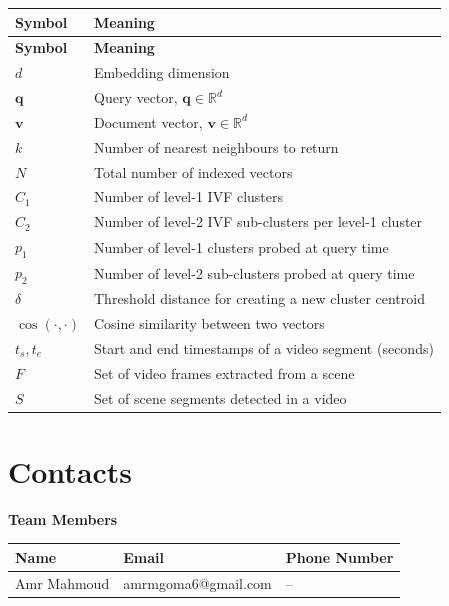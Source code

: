\documentclass[12pt, a4paper]{report}
\begin{document}
\begin{longtable}{>{\bfseries}p{3cm} p{10cm}}
  \toprule
  \textbf{Symbol} & \textbf{Meaning} \\
  \midrule
  \endfirsthead
  \toprule
  \textbf{Symbol} & \textbf{Meaning} \\
  \midrule
  \endhead
  $d$          & Embedding dimension \\
  $\mathbf{q}$ & Query vector, $\mathbf{q} \in \mathbb{R}^d$ \\
  $\mathbf{v}$ & Document vector, $\mathbf{v} \in \mathbb{R}^d$ \\
  $k$          & Number of nearest neighbours to return \\
  $N$          & Total number of indexed vectors \\
  $C_1$        & Number of level-1 IVF clusters \\
  $C_2$        & Number of level-2 IVF sub-clusters per level-1 cluster \\
  $p_1$        & Number of level-1 clusters probed at query time \\
  $p_2$        & Number of level-2 sub-clusters probed at query time \\
  $\delta$     & Threshold distance for creating a new cluster centroid \\
  $\cos(\cdot,\cdot)$ & Cosine similarity between two vectors \\
  $t_s, t_e$  & Start and end timestamps of a video segment (seconds) \\
  $F$          & Set of video frames extracted from a scene \\
  $S$          & Set of scene segments detected in a video \\
  \bottomrule
\end{longtable}

\newpage

\chapter*{Contacts}
\thispagestyle{fancy}

\textbf{Team Members}

\vspace{0.5em}
\begin{tabular}{lll}
  \toprule
  \textbf{Name} & \textbf{Email} & \textbf{Phone Number} \\
  \midrule
  Amr Mahmoud & amrmgoma6@gmail.com & -- \\
  \bottomrule
\end{tabular}
\end{document}
